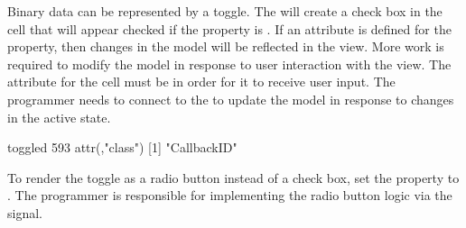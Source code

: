 Binary data can be represented by a toggle. The
 will create a check box in the
cell that will appear checked if the  property is
. If an attribute is defined for the property, then changes
in the model will be reflected in the view. More work is required to
modify the model in response to user interaction with the view. The
 attribute for the cell must be  in order
for it to receive user input. The programmer needs to connect to the
 to update the model in response to changes in the
active state.
\begin{Schunk}
\begin{Soutput}
toggled 
    593 
attr(,"class")
[1] "CallbackID"
\end{Soutput}
\end{Schunk}

To render the toggle as a radio button instead of a check box, set the
 property to . The programmer is responsible
for implementing the radio button logic via the  signal.

